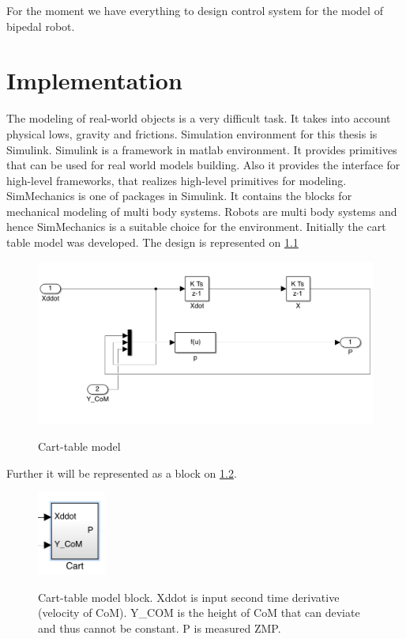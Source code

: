 \documentclass[12pt,a4paper]{report}
\begin{document}
			For the moment we have everything to design control system for the model of bipedal robot.
	\chapter{Implementation}
		The modeling of real-world objects is a very difficult task. It takes into account physical lows, gravity and frictions. Simulation environment for this thesis is Simulink.  Simulink is a framework in matlab environment. It provides primitives that can be used for real world models building. Also it provides the interface for high-level frameworks, that realizes high-level primitives for modeling. SimMechanics is one of packages in Simulink. It contains the blocks for mechanical modeling of multi body systems.  Robots are multi body systems and hence SimMechanics is a suitable choice for the environment.  
		Initially the cart table model was developed. The design is represented on \cref{fig:13}
		\begin{figure}[h!]
			\vspace{-0.2cm}
			\centering
			{\includegraphics[width=1\textwidth]{13}}
			\caption{Cart-table model}
			\label{fig:13}
			\vspace{-0.1cm}
		\end{figure}
		
		Further it will be represented as a block on \cref{fig:14}.
		
		\begin{figure}[h!]
			\vspace{-0.2cm}
			\centering
			{\includegraphics[width=0.2\textwidth]{14}}
			\caption{Cart-table model block. Xddot is input second time derivative (velocity of CoM). Y\_COM is the height of CoM that can deviate and thus cannot be constant. P is measured ZMP.}
			\label{fig:14}
			\vspace{-0.1cm}
		\end{figure}
		
\end{document}

